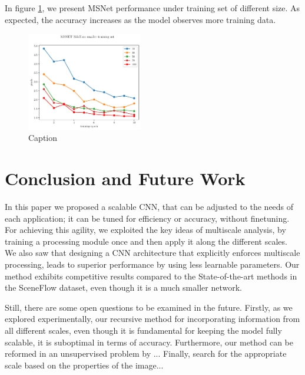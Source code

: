 \documentclass[runningheads]{llncs}
\begin{document}
In figure \ref{fig:msnet_smaller_tr_set}, we present MSNet performance under training set of different size. As expected, the accuracy increases as the model observes more training data.

\begin{figure}[htbp!]
    \centering
    \includegraphics[width=0.45\textwidth]{figures/freiburg_msnet_mae_smaller_training_set.pdf}
    \caption{Caption}
    \label{fig:msnet_smaller_tr_set}
\end{figure}

\section{Conclusion and Future Work}

In this paper we proposed a scalable CNN, that can be adjusted to the needs of each application; it can be tuned for efficiency or accuracy, without finetuning. For achieving this agility, we exploited the key ideas of multiscale analysis, by training a processing module once and then apply it along the different scales.  We also saw that designing a CNN architecture that explicitly enforces multiscale processing, leads to superior performance by using less learnable parameters. Our method exhibits competitive results compared to the State-of-the-art methods in the SceneFlow dataset, even though it is a much smaller network.

Still, there are some open questions to be examined in the future. Firstly, as we explored experimentally, our recursive method for incorporating information from all different scales, even though it is fundamental for keeping the model fully scalable, it is suboptimal in terms of accuracy. Furthermore, our method can be reformed in an unsupervised problem by ... Finally, search for the appropriate scale based on the properties of the image...   
\clearpage


\end{document}
